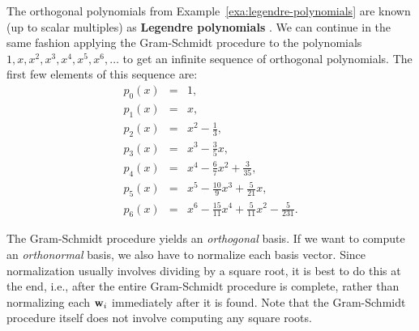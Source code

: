 The orthogonal polynomials from Example~\ref{exa:legendre-polynomials}
are known (up to scalar multiples) as \textbf{Legendre polynomials}%
%
.  We can continue in the same
fashion applying the Gram-Schmidt procedure to the polynomials
$1, x, x^2, x^3, x^4, x^5, x^6, \ldots$ to get an infinite sequence of
orthogonal polynomials. The first few elements of this sequence are:
\begin{eqnarray*}
  p_0(x) &=& 1, \\
  p_1(x) &=& x, \\
  p_2(x) &=& x^2-\frac{1}{3}, \\
  p_3(x) &=& x^3 - \frac{3}{5}x, \\
  p_4(x) &=& x^4 - \frac{6}{7}x^2 + \frac{3}{35}, \\
  p_5(x) &=& x^5 - \frac{10}{9}x^3 + \frac{5}{21}x, \\
  p_6(x) &=& x^6 - \frac{15}{11}x^4 + \frac{5}{11}x^2 - \frac{5}{231}.
\end{eqnarray*}
\begin{center}
\end{center}

The Gram-Schmidt procedure yields an {\em orthogonal} basis. If we
want to compute an {\em orthonormal} basis, we also have to normalize
each basis vector. Since normalization usually involves dividing by a
square root, it is best to do this at the end, i.e., after the entire
Gram-Schmidt procedure is complete, rather than normalizing each
$\vect{w}_i$ immediately after it is found. Note that the Gram-Schmidt
procedure itself does not involve computing any square roots.

